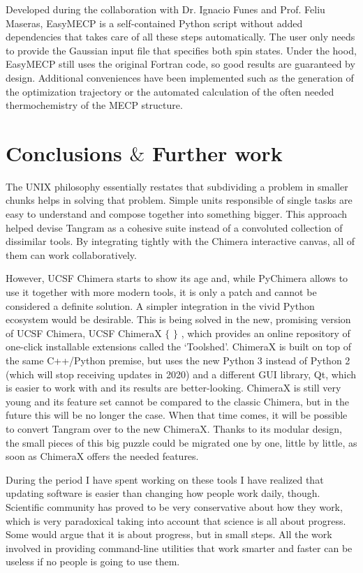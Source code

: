 Developed during the collaboration with Dr. Ignacio Funes and Prof. Feliu Maseras, EasyMECP is a self-contained Python script without added dependencies that takes care of all these steps automatically. The user only needs to provide the Gaussian input file that specifies both spin states. Under the hood, EasyMECP still uses the original Fortran code, so good results are guaranteed by design. Additional conveniences have been implemented such as the generation of the optimization trajectory or the automated calculation of the often needed thermochemistry of the MECP structure.

\section{Conclusions $\&$  Further work}
The UNIX philosophy essentially restates that subdividing a problem in smaller chunks helps in solving that problem. Simple units responsible of single tasks are easy to understand and compose together into something bigger. This approach helped devise Tangram as a cohesive suite instead of a convoluted collection of dissimilar tools. By integrating tightly with the Chimera interactive canvas, all of them can work collaboratively.

However, UCSF Chimera starts to show its age and, while PyChimera allows to use it together with more modern tools, it is only a patch and cannot be considered a definite solution. A simpler integration in the vivid Python ecosystem would be desirable. This is being solved in the new, promising version of UCSF Chimera, UCSF ChimeraX $ \{ $ $ \} $ , which provides an online repository of one-click installable extensions called the ‘Toolshed’. ChimeraX is built on top of the same C++/Python premise, but uses the new Python 3 instead of Python 2 (which will stop receiving updates in 2020) and a different GUI library, Qt, which is easier to work with and its results are better-looking. ChimeraX is still very young and its feature set cannot be compared to the classic Chimera, but in the future this will be no longer the case. When that time comes, it will be possible to convert Tangram over to the new ChimeraX. Thanks to its modular design, the small pieces of this big puzzle could be migrated one by one, little by little, as soon as ChimeraX offers the needed features.

During the period I have spent working on these tools I have realized that updating software is easier than changing how people work daily, though. Scientific community has proved to be very conservative about how they work, which is very paradoxical taking into account that science is all about progress. Some would argue that it is about progress, but in small steps. All the work involved in providing command-line utilities that work smarter and faster can be useless if no people is going to use them.

